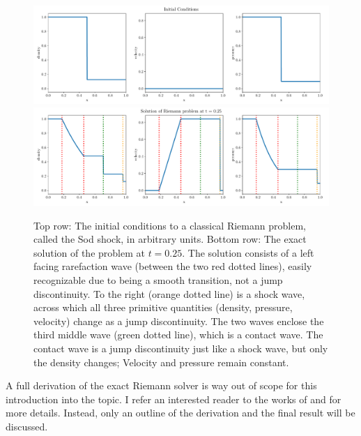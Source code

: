 \begin{figure}
\centering
\includegraphics[width=\textwidth]{./figures/FV/riemann_IC.pdf}%
\\
\includegraphics[width=\textwidth]{./figures/FV/riemann_exact_solution.pdf}%
\caption[Sod shock initial conditions and solution]{
    Top row: The initial conditions to a classical Riemann problem, called the Sod shock, in
    arbitrary units.
    Bottom row: The exact solution of the problem at $t = 0.25$. The solution consists of a left
    facing rarefaction wave (between the two red dotted lines), easily recognizable due to being a
    smooth transition, not a jump discontinuity.
    To the right (orange dotted line) is a shock wave, across which all three
    primitive quantities (density, pressure, velocity) change as a jump discontinuity.
    The two waves enclose the third middle wave (green dotted line), which is a contact wave.
    The contact wave is a jump discontinuity just like a shock wave, but only the density changes;
    Velocity and pressure remain constant.
    }%
    \label{fig:riemann-solved}
\end{figure}



A full derivation of the exact Riemann solver is way out of scope for this introduction into the
topic. I refer an interested reader to the works of \citet{toroRiemannSolversNumerical2009}
and \citet{levequeFiniteVolumeMethods2002} for more details. Instead, only an outline of the
derivation and the final result will be discussed.

